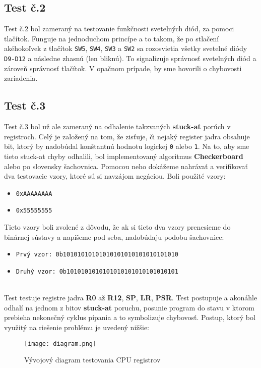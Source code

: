 \documentclass[11pt,a4paper]{article}
\begin{document}
    \subsection{Test č.2}
    
        \indent \hypertarget{label}{Test č.2} bol zameraný na testovanie funkčnosti svetelných diód, za pomoci tlačítok. Funguje na jednoduchom princípe a to takom, že po stlačení akéhokoľvek z tlačítok \texttt{SW5}, \texttt{SW4}, \texttt{SW3} a \texttt{SW2} sa rozosvietia všetky svetelné diódy \texttt{D9-D12} a následne zhasnú (len bliknú). To signalizuje správnosť svetelných diód a zároveň správnosť tlačítok. V opačnom prípade, by sme hovorili o chybovosti zariadenia.
        
    \subsection{Test č.3}
        \indent \hypertarget{label}{Test č.3} bol už ale zameraný na odhalenie takzvaných \textbf{stuck-at} porúch v registroch. Celý je založený na tom, že zisťuje, či nejaký register jadra obsahuje bit, ktorý by nadobúdal konštantnú hodnotu logickej \texttt{0} alebo \texttt{1}. Na to, aby sme tieto stuck-at chyby odhalili, bol implementovaný algoritmus \textbf{Checkerboard} alebo po slovensky šachovnica. Pomocou neho dokážeme nahrávať a verifikovať dva testovacie vzory, ktoré sú si navzájom negáciou. Boli použité vzory:
        \begin{itemize}
        \item \texttt{0xAAAAAAAA}
        \item \texttt{0x55555555}
        \end{itemize}
        Tieto vzory boli zvolené z dôvodu, že ak si tieto dva vzory prenesieme do binárnej sústavy a napíšeme pod seba, nadobúdaju podobu šachovnice:\\
        \begin{itemize}
        \item \texttt{Prvý vzor: \texttt{0b10101010101010101010101010101010}}
        \item \texttt{Druhý vzor: \texttt{0b1010101010101010101010101010101}}
        \end{itemize}\\
        \indent Test testuje registre jadra \textbf{R0} až \textbf{R12}, \textbf{SP}, \textbf{LR}, \textbf{PSR}. Test postupuje a akonáhle odhalí na jednom z bitov \textbf{stuck-at} poruchu, posunie program do stavu v ktorom prebieha nekonečný cyklus pípania a to symbolizuje chybovosť. Postup, ktorý bol využitý na riešenie problému je uvedený nižšie:
        \begin{figure*}[h]
        \centering
        \texttt{[image: diagram.png]}
        \caption{Vývojový diagram testovania CPU registrov}
        \end{figure*}
        
\end{document}
